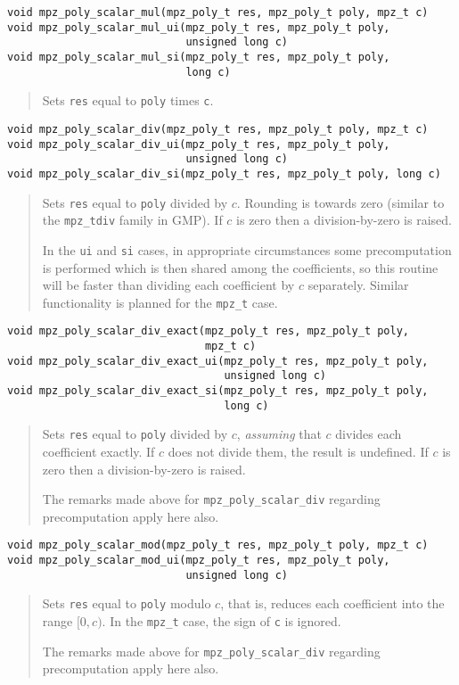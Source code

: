\documentclass[a4paper,10pt]{article}
\newcommand{\code}{\lstinline}
\begin{document}
\begin{lstlisting}
void mpz_poly_scalar_mul(mpz_poly_t res, mpz_poly_t poly, mpz_t c)
void mpz_poly_scalar_mul_ui(mpz_poly_t res, mpz_poly_t poly,
                            unsigned long c)
void mpz_poly_scalar_mul_si(mpz_poly_t res, mpz_poly_t poly,
                            long c)
\end{lstlisting}
\begin{quote}
Sets \code{res} equal to \code{poly} times \code{c}.
\end{quote}

\begin{lstlisting}
void mpz_poly_scalar_div(mpz_poly_t res, mpz_poly_t poly, mpz_t c)
void mpz_poly_scalar_div_ui(mpz_poly_t res, mpz_poly_t poly,
                            unsigned long c)
void mpz_poly_scalar_div_si(mpz_poly_t res, mpz_poly_t poly, long c)
\end{lstlisting}
\begin{quote}
Sets \code{res} equal to \code{poly} divided by $c$. Rounding is towards zero (similar to the \code{mpz_tdiv} family in GMP). If $c$ is zero then a division-by-zero is raised.

In the \code{ui} and \code{si} cases, in appropriate circumstances some precomputation is performed which is then shared among the coefficients, so this routine will be faster than dividing each coefficient by $c$ separately. Similar functionality is planned for the \code{mpz_t} case.
\end{quote}


\begin{lstlisting}
void mpz_poly_scalar_div_exact(mpz_poly_t res, mpz_poly_t poly,
                               mpz_t c)
void mpz_poly_scalar_div_exact_ui(mpz_poly_t res, mpz_poly_t poly,
                                  unsigned long c)
void mpz_poly_scalar_div_exact_si(mpz_poly_t res, mpz_poly_t poly,
                                  long c)
\end{lstlisting}
\begin{quote}
Sets \code{res} equal to \code{poly} divided by $c$, \emph{assuming} that $c$ divides each coefficient exactly. If $c$ does not divide them, the result is undefined. If $c$ is zero then a division-by-zero is raised.

The remarks made above for \code{mpz_poly_scalar_div} regarding precomputation apply here also.
\end{quote}

\begin{lstlisting}
void mpz_poly_scalar_mod(mpz_poly_t res, mpz_poly_t poly, mpz_t c)
void mpz_poly_scalar_mod_ui(mpz_poly_t res, mpz_poly_t poly,
                            unsigned long c)
\end{lstlisting}
\begin{quote}
Sets \code{res} equal to \code{poly} modulo $c$, that is, reduces each coefficient into the range $[0, c)$. In the \code{mpz_t} case, the sign of \code{c} is ignored.

The remarks made above for \code{mpz_poly_scalar_div} regarding precomputation apply here also.
\end{quote}
\end{document}
